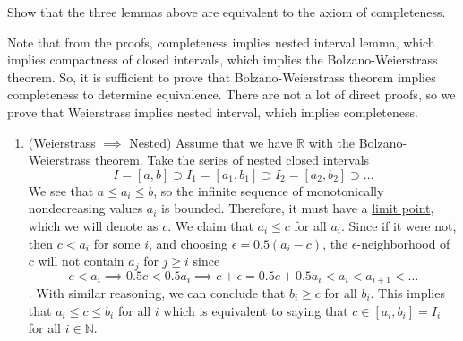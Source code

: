   \begin{exercise}[Zorich 2.3.4]
    Show that the three lemmas above are equivalent to the axiom of completeness. 
  \end{exercise}
  \begin{solution}
    Note that from the proofs, completeness implies nested interval lemma, which implies compactness of closed intervals, which implies the Bolzano-Weierstrass theorem. So, it is sufficient to prove that Bolzano-Weierstrass theorem implies completeness to determine equivalence. There are not a lot of direct proofs, so we prove that Weierstrass implies nested interval, which implies completeness. 
    \begin{enumerate}
      \item (Weierstrass $\implies$ Nested) Assume that we have $\mathbb{R}$ with the Bolzano-Weierstrass theorem. Take the series of nested closed intervals 
      \begin{equation}
        I = [a, b] \supset I_1 = [a_1, b_1] \supset I_2 = [a_2, b_2] \supset \ldots
      \end{equation}
      We see that $a \leq a_i \leq b$, so the infinite sequence of monotonically nondecreasing values $a_i$ is bounded. Therefore, it must have a \hyperref[pst-def:limit-point]{limit point}, which we will denote as $c$. We claim that $a_i \leq c$ for all $a_i$. Since if it were not, then $c < a_i$ for some $i$, and choosing $\epsilon = 0.5 (a_i - c)$, the $\epsilon$-neighborhood of $c$ will not contain $a_j$ for $j \geq i$ since 
      \begin{equation}
        c < a_i \implies 0.5 c < 0.5 a_i \implies c + \epsilon = 0.5c + 0.5 a_i < a_i< a_{i+1} < \ldots
      \end{equation}
      . 
      With similar reasoning, we can conclude that $b_i \geq c$ for all $b_i$. This implies that $a_i \leq c \leq b_i$ for all $i$ which is equivalent to saying that $c \in [a_i, b_i] = I_i$ for all $i \in \mathbb{N}$. 
      

\end{enumerate}
\end{solution}
